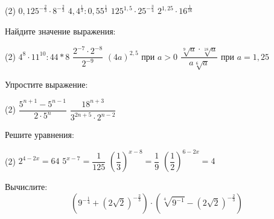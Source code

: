 \begin{class}[number=1]
\begin{listofex}
		\begin{tasks}(2)
			\task \( 0,125^{-\frac{2}{3}}\cdot 8^{-\frac{2}{3}} \)
			\task \( 4,4^{\frac{1}{3}}:0,55^{\frac{1}{3}} \)
			\task \( 125^{1,5}\cdot 25^{-\frac{3}{4}} \)
			\task \( 2^{1,25}\cdot 16^{\frac{1}{16}} \)
		\end{tasks}
		\item Найдите значение выражения:
		\begin{tasks}(2)
			\task \( 4^8 \cdot 11^{10}:44*8 \)
			\task \( \dfrac{2^{-7}\cdot2^{-8}}{2^{-9}} \)
			\task \( (4a)^{2,5} \) при \( a>0 \)
			\task \( \dfrac{\sqrt[9]{a} \cdot \sqrt[18]{a} }{a \sqrt[6]{a}} \) при \(a=1,25\)
		\end{tasks}
		\item Упростите выражение:
		\begin{tasks}(2)
			\task \( \dfrac{5^{n+1}-5^{n-1}}{2\cdot 5^n} \)
			\task \( \dfrac{18^{n+3}}{3^{2n+5} \cdot 2^{n-2}} \)
		\end{tasks}
		\item Решите уравнения: %
		\begin{tasks}(2)
			\task \( 2^{4-2x}=64 \) %
			\task \( 5^{x-7}=\dfrac{1}{125} \) %
			\task \( \left( \dfrac{1}{3} \right)^{x-8} = \dfrac{1}{9}  \) %
			\task \( \left( \dfrac{1}{2} \right)^{6-2x} = 4  \) %
		\end{tasks}
		\item Вычислите: \[ \left( 9^{-\frac{1}{4}}+(2\sqrt{2})^{-\frac{2}{3}} \right) \cdot \left( \sqrt[4]{9^{-1}} - (2\sqrt{2})^{-\frac{2}{3}} \right)  \]
	\end{listofex}
\end{class}

